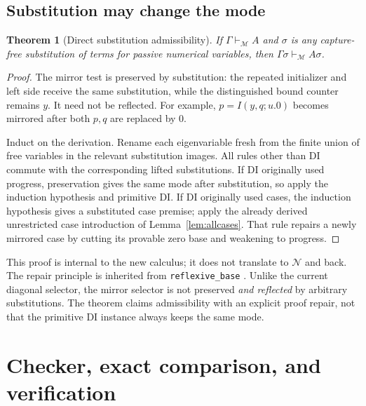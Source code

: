 \documentclass[11pt]{article}
\newtheorem{theorem}{Theorem}[section]
\theoremstyle{definition}\newtheorem{definition}[theorem]{Definition}
\newcommand{\Mcal}{\mathcal M}
\newcommand{\Ncal}{\mathcal N}
\begin{document}
\subsection{Substitution may change the mode}
\begin{theorem}[Direct substitution admissibility]\label{thm:subst}
If $\Gamma\vdash_{\Mcal}A$ and $\sigma$ is any capture-free substitution
of terms for passive numerical variables, then
$\Gamma\sigma\vdash_{\Mcal}A\sigma$.
\end{theorem}
\begin{proof}
The mirror test is preserved by substitution: the repeated initializer
and left side receive the same substitution, while the distinguished
bound counter remains $y$. It need not be reflected. For example,
$p=I(y,q;u.0)$ becomes mirrored after both $p,q$ are replaced by $0$.

Induct on the derivation. Rename each eigenvariable fresh from the finite
union of free variables in the relevant substitution images. All rules
other than DI commute with the corresponding lifted substitutions. If
DI originally used progress, preservation gives the same mode after
substitution, so apply the induction hypothesis and primitive DI. If
DI originally used cases, the induction hypothesis gives a substituted
case premise; apply the already derived unrestricted case introduction
of Lemma~\ref{lem:allcases}. That rule repairs a newly mirrored case by
cutting its provable zero base and weakening to progress.
\end{proof}

This proof is internal to the new calculus; it does not translate to
$\Ncal$ and back. The repair principle is inherited from
\texttt{reflexive\_base} \cite{reflexive}. Unlike the current diagonal
selector, the mirror selector is not preserved \emph{and reflected} by
arbitrary substitutions. The theorem claims admissibility with an
explicit proof repair, not that the primitive DI instance always keeps
the same mode.


\section{Checker, exact comparison, and verification}\label{sec:implementation}
\end{document}
